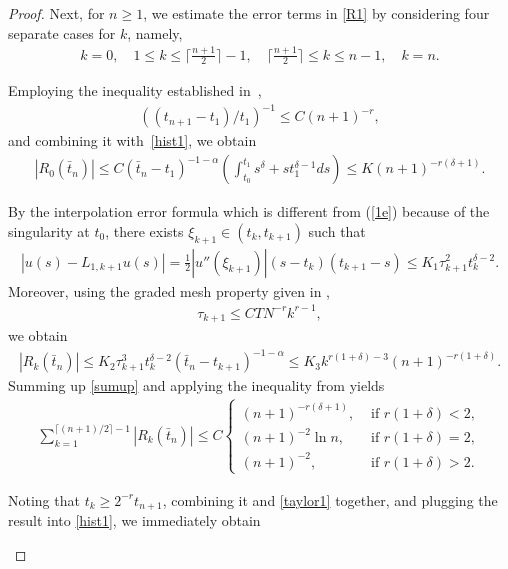 \documentclass[10pt, reqno]{amsart}
\theoremstyle{remark}
\theoremstyle{definition}
\numberwithin{table}{section}
\begin{document}
\begin{proof}
Next, for $n \ge 1$, we estimate the error terms in \eqref{R1} by considering four separate cases for $k$, namely,
\begin{align*}
    k=0, \quad 1 \le k \le \lceil  \frac{n+1}{2} \rceil - 1,\quad \lceil \frac{n+1}{2} \rceil \le k \le n - 1,\quad k = n.
\end{align*}
\begin{description}[leftmargin=0pt, labelindent=0pt]
\item [Case 1 ($k=0$)] Employing the inequality established in~\cite{cao2020},
\begin{align}
(({t_{n+1}-t_1})/{t_1})^{-1} \le C (n+1)^{-r}, \label{time}
\end{align}
and combining it with~\eqref{hist1}, we obtain
    \begin{align}
|R_{0}(\bar{t}_n)| \leq C(\bar{t}_n-t_1)^{-1-\alpha}(\int_{t_0}^{t_1} s^\delta+s t_1^{\delta-1} d s) \leq K(n+1)^{-r(\delta+1)}.
\end{align}
    \item[Case 2 ($ 1\leq k\leq \lceil (n+1)/{2}\rceil-1$) ] By the interpolation error formula  which is different from (\ref{1e}) because of the singularity at $t_0$, there exists $\xi_{k+1} \in (t_k, t_{k+1})$ such that
\begin{align}
|u(s) - L_{1,k+1}u(s)|
= \tfrac12 |u''(\xi_{k+1})| (s-t_k)(t_{k+1}-s)
\le K_1 \tau_{k+1}^2 t_k^{\delta-2}. \label{taylor1}
\end{align}
Moreover, using the graded mesh property given in \cite{cao2020},
\begin{align}
    \tau_{k+1}\leq C TN^{-r}k^{r-1},\label{step}
\end{align}
we obtain
    \begin{align}
    |R_{k}(\bar{t}_n)| \leq K_2\tau_{k+1}^3t_k^{\delta-2}(\bar{t}_n-t_{k+1})^{-1-\alpha}\leq K_3k^{r(1+\delta)-3}(n+1)^{-r(1+\delta)}.\label{sumup}
    \end{align}
Summing up \eqref{sumup} and applying the inequality from \cite{gracia2018} yields
\begin{align}
    \sum_{k=1}^{\lceil (n+1)/{2}\rceil-1}|R_{k}(\bar{t}_n)| \leq C\begin{cases}(n+1)^{-r(\delta+1)},&\text{ if }r(1+\delta)<2, \\(n+1)^{-2}\ln n,&\text{ if }r(1+\delta)=2, \\(n+1)^{-2},&\text{ if }r(1+\delta)>2. \end{cases}
\end{align}
\item[Case 3 ($\lceil (n+1)/{2}\rceil\leq k \leq n-1$) ] Noting that $t_k \ge 2^{-r} t_{n+1}$, combining it and \eqref{taylor1} together, and plugging the result into \eqref{hist1}, we immediately obtain 

\end{description}
\end{proof}
\end{document}
